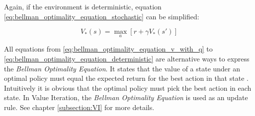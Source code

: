 Again, if the environment is deterministic, equation \ref{eq:bellman_optimality_equation_stochastic} can be simplified:

\begin{equation}
V_*(s) = \max_a[r+\gamma V_*(s')]
\label{eq:bellman_optimality_equation_deterministic}
\end{equation}

All equations from \ref{eq:bellman_optimality_equation_v_with_q} to \ref{eq:bellman_optimality_equation_deterministic} are alternative ways to express the \textit{Bellman Optimality Equation}. It states that the value of a state under an optimal policy must equal the expected return for the best action in that state \cite{SuttonBarto2018}. Intuitively it is obvious that the optimal policy must pick the best action in each state. In Value Iteration, the \textit{Bellman Optimality Equation} is used as an update rule. See chapter \ref{subsection:VI} for more details.